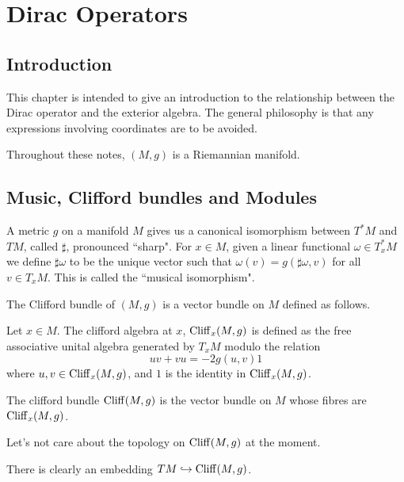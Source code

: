 
\chapter{Dirac Operators} %

\label{AppendixE} %




\section{Introduction}
This chapter is intended to give an introduction to the relationship between
the Dirac operator and the exterior algebra. The general philosophy
is that any expressions involving coordinates are to be avoided.

Throughout these notes, $(M,g)$ is a Riemannian manifold.

\section{Music, Clifford bundles and Modules}
A metric $g$ on a manifold $M$ gives us a canonical isomorphism between $T^*M$
and $TM$, called $\sharp$, pronounced ``sharp". For $x \in M$, given a linear functional
$\omega \in T^*_xM$ we define $\sharp\omega$ to be the unique
vector such that $\omega(v) = g(\sharp\omega,v)$ for all $v \in T_xM$.
This is called the ``musical isomorphism".

The Clifford bundle of $(M,g)$ is a vector bundle on $M$ defined as follows.
\begin{definition}
    Let $x \in M$. The clifford algebra at $x$, $\operatorname{Cliff}_x(M,g)$ is defined
    as the free associative unital algebra generated by $T_xM$ modulo the relation
    \begin{equation*}
        uv+vu = -2g(u,v)1
    \end{equation*}
    where $u,v \in \operatorname{Cliff}_x(M,g)$, and $1$ is the identity in $\operatorname{Cliff}_x(M,g)$.
    
    
    The clifford bundle $\operatorname{Cliff}(M,g)$ is the vector bundle on $M$ whose fibres are 
    $\operatorname{Cliff}_x(M,g)$.
\end{definition}
Let's not care about the topology on $\operatorname{Cliff}(M,g)$ at the moment.

There is clearly an embedding $TM \hookrightarrow \operatorname{Cliff}(M,g)$. 

